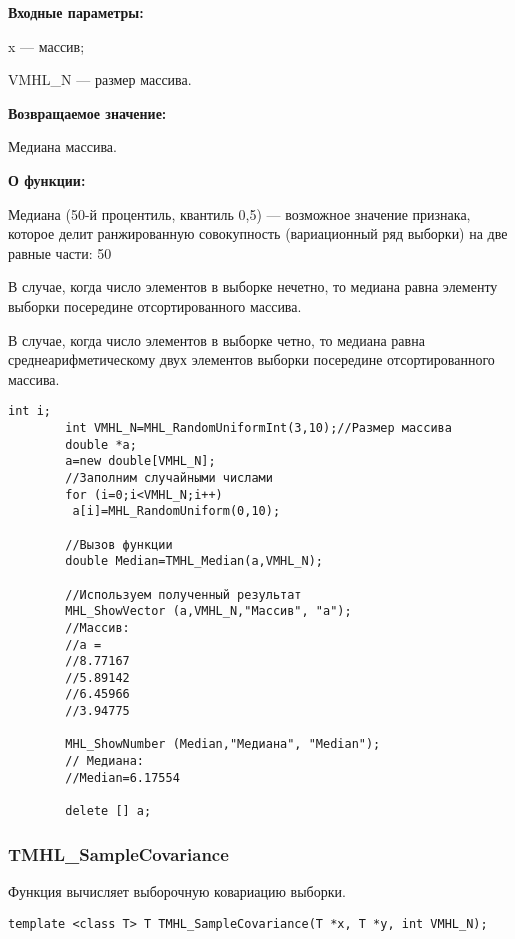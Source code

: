 \documentclass[a4paper,12pt]{article}
\begin{document}
\textbf{Входные параметры:}

 x --- массив;
 
 VMHL\_N --- размер массива.

\textbf{Возвращаемое значение:}

 Медиана массива.
 
\textbf{ О функции:}

Медиана (50-й процентиль, квантиль 0,5) — возможное значение признака, которое делит ранжированную совокупность (вариационный ряд выборки) на две равные части: 50 %

В случае, когда число элементов в выборке нечетно, то медиана равна элементу выборки посередине отсортированного массива.

В случае, когда число элементов в выборке четно, то медиана равна среднеарифметическому двух элементов выборки посередине отсортированного массива.



\begin{lstlisting}[label=code_use_TMHL_Median,caption=Пример использования]
        int i;
        int VMHL_N=MHL_RandomUniformInt(3,10);//Размер массива
        double *a;
        a=new double[VMHL_N];
        //Заполним случайными числами
        for (i=0;i<VMHL_N;i++)
         a[i]=MHL_RandomUniform(0,10);

        //Вызов функции
        double Median=TMHL_Median(a,VMHL_N);

        //Используем полученный результат
        MHL_ShowVector (a,VMHL_N,"Массив", "a");
        //Массив:
        //a =
        //8.77167
        //5.89142
        //6.45966
        //3.94775

        MHL_ShowNumber (Median,"Медиана", "Median");
        // Медиана:
        //Median=6.17554

        delete [] a;
\end{lstlisting}

\subsubsection{TMHL\_SampleCovariance}\label{TMHL_SampleCovariance}

Функция вычисляет выборочную ковариацию выборки.


\begin{lstlisting}[label=code_syntax_TMHL_SampleCovariance,caption=Синтаксис]
template <class T> T TMHL_SampleCovariance(T *x, T *y, int VMHL_N);
\end{lstlisting}
\end{document}
